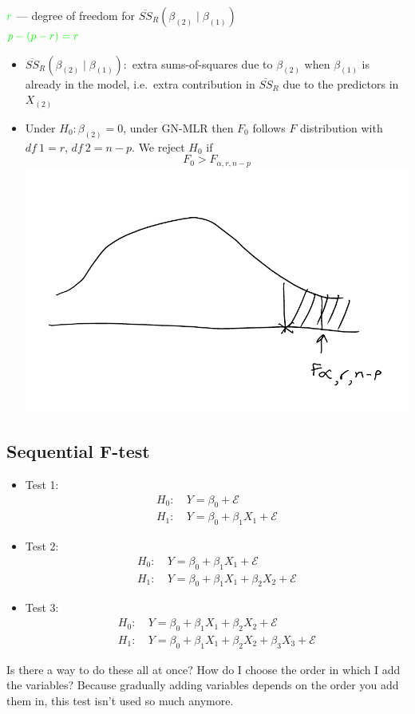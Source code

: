 \documentclass[12 pt]{article}
\begin{document}
$\textcolor{green}{r}$ --- degree of freedom for $\overline{SS}_R(\beta_{(2)} \mid
\beta_{(1)})$
\\ $\textcolor{green}{p - (p-r) = r}$
\begin{itemize}
\item $\overline{SS}_{R}(\beta_{(2)} \mid \beta_{(1)}):$ extra
  sums-of-squares due to $\beta_{(2)}$ when $\beta_{(1)}$ is already
  in the model, i.e.\ extra contribution in $\overline{SS}_R$ due to
  the predictors in $X_{(2)}$
\item Under $H_0: \beta_{(2)} = 0$, under GN-MLR then $F_0$ follows
  $F$ distribution with $df\ 1 = r$, $df\ 2 = n - p$. We reject $H_0$
  if
  $$F_0 > F_{\alpha, r, n-p}$$
  \includegraphics[width=.4\textwidth]{28.pdf}
\end{itemize}
\subsection{Sequential F-test}
\begin{itemize}
\item Test 1:
  \begin{align*}
    H_0: \ & Y = \beta_0 + \mathcal{E}
    \\ H_1: \ & Y = \beta_0 + \beta_1 X_1 + \mathcal{E}
  \end{align*}
\item Test 2:
  \begin{align*}
    H_0: \ & Y = \beta_0 + \beta_1 X_1 + \mathcal{E}
    \\ H_1: \ & Y = \beta_0 + \beta_1 X_1 + \beta_2 X_2 + \mathcal{E}
  \end{align*}
\item Test 3:
  \begin{align*}
    H_0: \ & Y = \beta_0+ \beta_1 X_1 + \beta_2 X_2 + \mathcal{E}
    \\ H_1: \ & Y = \beta_0 + \beta_1 X_1 + \beta_2 X_2 + \beta_3 X_3 + \mathcal{E}
  \end{align*}
\end{itemize}
Is there a way to do these all at once? How do I choose the order in
which I add the variables? Because gradually adding variables depends
on the order you add them in, this test isn't used so much anymore.
\end{document}

